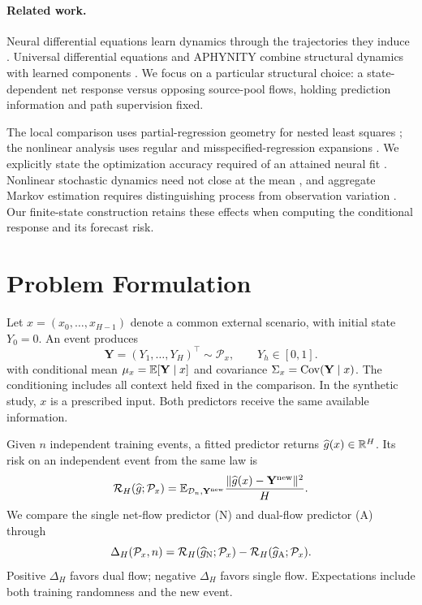\paragraph{Related work.}
Neural differential equations learn dynamics through the trajectories they induce \citep{chen2018,rubanova2019}. Universal differential equations and APHYNITY combine structural dynamics with learned components \citep{rackauckas2020,yin2021}. We focus on a particular structural choice: a state-dependent net response versus opposing source-pool flows, holding prediction information and path supervision fixed.

The local comparison uses partial-regression geometry for nested least squares \citep{ding2020,hansen2022}; the nonlinear analysis uses regular and misspecified-regression expansions \citep{jennrich1969,white1981}. We explicitly state the optimization accuracy required of an attained neural fit \citep{schmidthieber2020}. Nonlinear stochastic dynamics need not close at the mean \citep{schnoerr2017}, and aggregate Markov estimation requires distinguishing process from observation variation \citep{bernstein2016}. Our finite-state construction retains these effects when computing the conditional response and its forecast risk.

\section{Problem Formulation}
Let $x=(x_0,\ldots,x_{H-1})$ denote a common external scenario, with initial state $Y_0=0$. An event produces
\begin{equation}
 \mathbf Y=(Y_1,\ldots,Y_H)^\top\sim\mathcal P_x,
 \qquad Y_h\in[0,1].
 \label{eq:conditional_law}
\end{equation}
with conditional mean $\mu_x=\mathbb E[\mathbf Y\mid x]$ and covariance $\Sigma_x=\operatorname{Cov}(\mathbf Y\mid x)$. The conditioning includes all context held fixed in the comparison. In the synthetic study, $x$ is a prescribed input. Both predictors receive the same available information.

Given $n$ independent training events, a fitted predictor returns $\widehat g(x)\in\mathbb R^H$. Its risk on an independent event from the same law is
\begin{equation}
 \mathcal R_H(\widehat g;\mathcal P_x)
 =\mathbb E_{\mathcal D_n,\mathbf Y^{\rm new}}
 \frac{\|\widehat g(x)-\mathbf Y^{\rm new}\|^2}{H}.
 \label{eq:risk}
\end{equation}
We compare the single net-flow predictor (N) and dual-flow predictor (A) through
\begin{equation}
 \Delta_H(\mathcal P_x,n)
 =\mathcal R_H(\widehat g_{\mathrm N};\mathcal P_x)
 -\mathcal R_H(\widehat g_{\mathrm A};\mathcal P_x).
 \label{eq:gap}
\end{equation}
Positive $\Delta_H$ favors dual flow; negative $\Delta_H$ favors single flow. Expectations include both training randomness and the new event.

